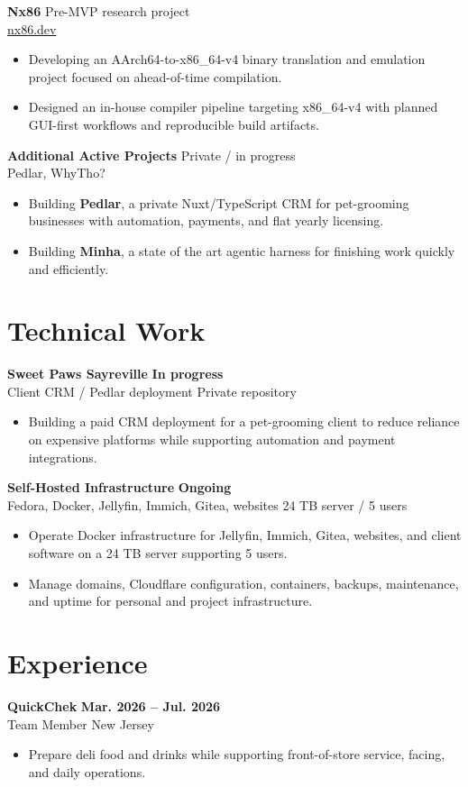 \documentclass[10pt,letterpaper]{article}
\newcommand{\resumeItem}[1]{\item #1}
\newcommand{\resumeSubheading}[4]{%
  \textbf{#1} \hfill \textbf{#2}\\[-1pt]
  {\small #3} \hfill {\small #4}
}
\newcommand{\projectHeading}[3]{%
  \textbf{#1} \hfill {\small #2}\\[-1pt]
  {\small #3}
}
\begin{document}
\projectHeading{Nx86}{Pre-MVP research project}{\href{https://nx86.dev}{nx86.dev}}
\begin{itemize}
  \resumeItem{Developing an AArch64-to-x86\_64-v4 binary translation and emulation project focused on ahead-of-time compilation.}
  \resumeItem{Designed an in-house compiler pipeline targeting x86\_64-v4 with planned GUI-first workflows and reproducible build artifacts.}
\end{itemize}

\projectHeading{Additional Active Projects}{Private / in progress}{Pedlar, WhyTho?}
\begin{itemize}
  \resumeItem{Building \textbf{Pedlar}, a private Nuxt/TypeScript CRM for pet-grooming businesses with automation, payments, and flat yearly licensing.}
  \resumeItem{Building \textbf{Minha}, a state of the art agentic harness for finishing work quickly and efficiently.}
\end{itemize}

\section{Technical Work}

\resumeSubheading{Sweet Paws Sayreville}{In progress}{Client CRM / Pedlar deployment}{Private repository}
\begin{itemize}
  \resumeItem{Building a paid CRM deployment for a pet-grooming client to reduce reliance on expensive platforms while supporting automation and payment integrations.}
\end{itemize}

\resumeSubheading{Self-Hosted Infrastructure}{Ongoing}{Fedora, Docker, Jellyfin, Immich, Gitea, websites}{24 TB server / 5 users}
\begin{itemize}
  \resumeItem{Operate Docker infrastructure for Jellyfin, Immich, Gitea, websites, and client software on a 24 TB server supporting 5 users.}
  \resumeItem{Manage domains, Cloudflare configuration, containers, backups, maintenance, and uptime for personal and project infrastructure.}
\end{itemize}

\section{Experience}

\resumeSubheading{QuickChek}{Mar. 2026 -- Jul. 2026}{Team Member}{New Jersey}
\begin{itemize}
  \resumeItem{Prepare deli food and drinks while supporting front-of-store service, facing, and daily operations.}
\end{itemize}
\end{document}
